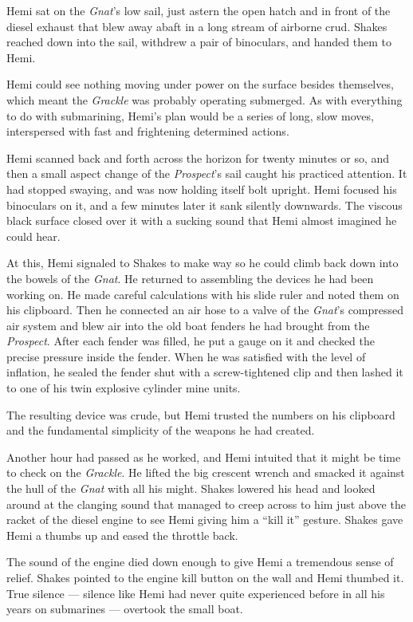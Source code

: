 \documentclass[
]{scrbook}
\begin{document}
Hemi sat on the \emph{Gnat}'s low sail, just astern the open hatch and
in front of the diesel exhaust that blew away abaft in a long stream of
airborne crud. Shakes reached down into the sail, withdrew a pair of
binoculars, and handed them to Hemi.

Hemi could see nothing moving under power on the surface besides
themselves, which meant the \emph{Grackle} was probably operating
submerged. As with everything to do with submarining, Hemi's plan would
be a series of long, slow moves, interspersed with fast and frightening
determined actions.

Hemi scanned back and forth across the horizon for twenty minutes or so,
and then a small aspect change of the \emph{Prospect}'s sail caught his
practiced attention. It had stopped swaying, and was now holding itself
bolt upright. Hemi focused his binoculars on it, and a few minutes later
it sank silently downwards. The viscous black surface closed over it
with a sucking sound that Hemi almost imagined he could hear.

At this, Hemi signaled to Shakes to make way so he could climb back down
into the bowels of the \emph{Gnat}. He returned to assembling the
devices he had been working on. He made careful calculations with his
slide ruler and noted them on his clipboard. Then he connected an air
hose to a valve of the \emph{Gnat}'s compressed air system and blew air
into the old boat fenders he had brought from the \emph{Prospect}. After
each fender was filled, he put a gauge on it and checked the precise
pressure inside the fender. When he was satisfied with the level of
inflation, he sealed the fender shut with a screw-tightened clip and
then lashed it to one of his twin explosive cylinder mine units.

The resulting device was crude, but Hemi trusted the numbers on his
clipboard and the fundamental simplicity of the weapons he had created.

Another hour had passed as he worked, and Hemi intuited that it might be
time to check on the \emph{Grackle}. He lifted the big crescent wrench
and smacked it against the hull of the \emph{Gnat} with all his might.
Shakes lowered his head and looked around at the clanging sound that
managed to creep across to him just above the racket of the diesel
engine to see Hemi giving him a ``kill it'' gesture. Shakes gave Hemi a
thumbs up and eased the throttle back.

The sound of the engine died down enough to give Hemi a tremendous sense
of relief. Shakes pointed to the engine kill button on the wall and Hemi
thumbed it. True silence --- silence like Hemi had never quite
experienced before in all his years on submarines --- overtook the small
boat.
\end{document}
